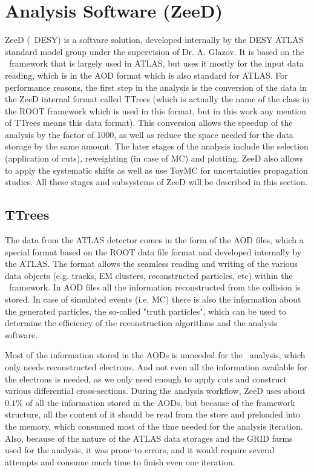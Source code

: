 \chapter{Analysis Software (ZeeD)}
\label{sec:ZeeD}
ZeeD (\Zee\ DESY) is a softvare solution, developed internally by the DESY ATLAS standard model group under the supervision of Dr. A. Glazov. It is based on the \Athena\ framework that is largely used in ATLAS, but uses it mostly for the input data reading, which is in the AOD format which is also standard for ATLAS. For performance reasons, the first step in the analysis is the conversion of the data in the ZeeD internal format called TTrees (which is actually the name of the class in the ROOT framework which is used in this format, but in this work any mention of TTrees means this data format). This conversion allows the speedup of the analysis by the factor of 1000, as well as reduce the space needed for the data storage by the same amount. The later stages of the analysis include the selection (application of cuts), reweighting (in case of MC) and plotting. ZeeD also allows to apply the systematic shifts as well as use ToyMC for uncertainties propagation studies. All these stages and subsystems of ZeeD will be described in this section.

\section{TTrees}
\label{sec:ZeeD_TTrees}

The data from the ATLAS detector comes in the form of the AOD files, which a special format based on the ROOT data file format and developed internally by the ATLAS. The format allows the seamless reading and writing of the various data objects (e.g. tracks, EM clusters, reconstructed particles, etc) within the \Athena\ framework. In AOD files all the information reconstructed from the collision is stored. In case of simulated events (i.e. MC) there is also the information about the generated particles, the so-called "truth particles", which can be used to determine the efficiency of the reconstruction algorithms and the analysis software.

Most of the information stored in the AODs is unneeded for the \Zee\ analysis, which only needs reconstructed electrons. And not even all the information available for the electrons is needed, as we only need enough to apply cuts and construct various differential cross-sections. During the analysis workflow, ZeeD uses about $0.1\%$ of all the information stored in the AODs, but because of the framework structure, all the content of it should be read from the store and preloaded into the memory, which consumed most of the time needed for the analysis iteration. Also, because of the nature of the ATLAS data storages and the GRID farms used for the analysis, it was prone to errors, and it would require several attempts and consume much time to finish even one iteration.

